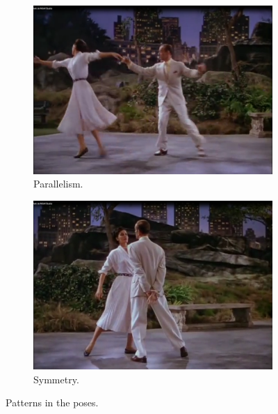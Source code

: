 \begin{figure}[h!]
	\centering
        \begin{subfigure}[b!]{0.45\textwidth}
        	\centering
                \includegraphics[width=\linewidth]{img/parallelism}
                \caption{Parallelism.}
                \label{fig:parallelism}
        \end{subfigure}
        \quad
        \begin{subfigure}[b!]{0.45\textwidth}
        	\centering
                \includegraphics[width=\linewidth]{img/symmetry}
                \caption{Symmetry.}
                \label{fig:symmetry}
        \end{subfigure}%
        \caption{Patterns in the poses.}
	\label{fig:patterns}
\end{figure}

